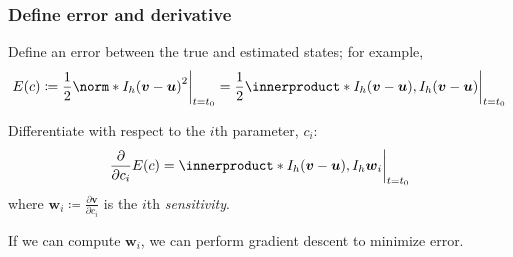 \documentclass{beamer}
\newcommand{\bu}{\boldsymbol u}
\newcommand{\bv}{\boldsymbol v}
\newcommand{\bw}{\boldsymbol w}
\begin{document}

\begin{frame}
  \frametitle{Define error and derivative}
  Define an error between the true and estimated states; for example,
  \begin{equation*}
    E(c) \coloneq \frac12 \norm*{I_h(\bv - \bu)}^2 \bigg \lvert_{t=t_0}
    = \frac12 \innerproduct*{I_h(\bv - \bu), I_h(\bv - \bu)} \bigg \lvert_{t=t_0}
  \end{equation*}
  \pause

  Differentiate with respect to the $i$th parameter, $c_i$:
  \begin{equation*}
    \frac{\partial}{\partial c_i} E(c) = \innerproduct*{I_h(\bv - \bu),
    I_h \bw_i} \bigg \lvert_{t=t_0}
  \end{equation*}
  where $\bw_i \coloneq \frac{\partial \bv}{\partial c_i}$ is the $i$th
  \textit{sensitivity}.
  \newline
  \pause

  If we can compute $\bw_i$, we can perform gradient descent to minimize error.
\end{frame}
\end{document}

